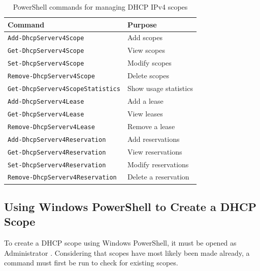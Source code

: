\begin{table}[H]
  \centering
  \small\sffamily
  \renewcommand{\arraystretch}{1.25}
  \begin{tabular}{@{}p{7.2cm}p{7cm}@{}}
    \toprule
    \textbf{Command} & \textbf{Purpose} \\
    \midrule
    \texttt{\footnotesize Add-DhcpServerv4Scope} & Add scopes \\
    \texttt{\footnotesize Get-DhcpServerv4Scope} & View scopes \\
    \texttt{\footnotesize Set-DhcpServerv4Scope} & Modify scopes \\
    \texttt{\footnotesize Remove-DhcpServerv4Scope} & Delete scopes \\
    \texttt{\footnotesize Get-DhcpServerv4ScopeStatistics} & Show usage statistics \\
    \texttt{\footnotesize Add-DhcpServerv4Lease} & Add a lease \\
    \texttt{\footnotesize Get-DhcpServerv4Lease} & View leases \\
    \texttt{\footnotesize Remove-DhcpServerv4Lease} & Remove a lease \\
    \texttt{\footnotesize Add-DhcpServerv4Reservation} & Add reservations \\
    \texttt{\footnotesize Get-DhcpServerv4Reservation} & View reservations \\
    \texttt{\footnotesize Set-DhcpServerv4Reservation} & Modify reservations \\
    \texttt{\footnotesize Remove-DhcpServerv4Reservation} & Delete a reservation \\
    \bottomrule
  \end{tabular}
  \caption{PowerShell commands for managing DHCP IPv4 scopes}\label{tab:dhcp-cmdlets}
\end{table}


\subsection{Using Windows PowerShell to Create a DHCP Scope}
\label{sec:dhcp-psscope}
To create a DHCP scope using Windows PowerShell, it must be opened as Administrator \cite{sherry-dhcp-scope}. Considering that scopes have most likely been made already, a command must first be run to check for existing scopes.

